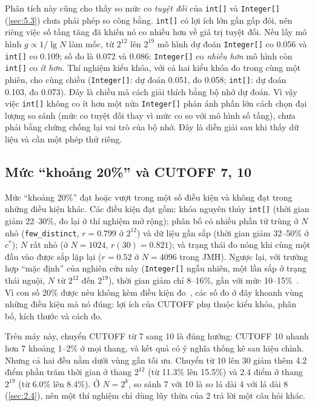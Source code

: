 \documentclass[12pt,a4paper]{article}
\begin{document}
Phân tích này cũng cho thấy so mức co \emph{tuyệt đối} của \texttt{int[]} và \texttt{Integer[]} (\cref{sec:5.3}) chưa phải phép so công bằng. \texttt{int[]} có lợi ích lớn gần gấp đôi, nên riêng việc số tầng tăng đã khiến nó co nhiều hơn về giá trị tuyệt đối. Nếu lấy mô hình $g \propto 1/\lg N$ làm mốc, từ $2^{12}$ lên $2^{19}$ mô hình dự đoán \texttt{Integer[]} co 0.056 và \texttt{int[]} co 0.109; số đo là 0.072 và 0.086: \texttt{Integer[]} co \emph{nhiều hơn} mô hình còn \texttt{int[]} co \emph{ít hơn}. Thí nghiệm kiểu khóa, với cả hai kiểu khóa đo trong cùng một phiên, cho cùng chiều (\texttt{Integer[]}: dự đoán 0.051, đo 0.058; \texttt{int[]}: dự đoán 0.103, đo 0.073). Đây là chiều mà cách giải thích bằng bộ nhớ dự đoán. Vì vậy việc \texttt{int[]} không co ít hơn một nửa \texttt{Integer[]} phản ánh phần lớn cách chọn đại lượng so sánh (mức co tuyệt đối thay vì mức co so với mô hình số tầng), chưa phải bằng chứng chống lại vai trò của bộ nhớ. Đây là diễn giải sau khi thấy dữ liệu và cần một phép thử riêng.

\subsection{Mức ``khoảng 20\%'' và CUTOFF 7, 10}\label{sec:6.3}\label{sec:6.4}
Mức ``khoảng 20\%'' đạt hoặc vượt trong một số điều kiện và không đạt trong những điều kiện khác. Các điều kiện đạt gồm: khóa nguyên thủy \texttt{int[]} (thời gian giảm 22--30\%, đo lại ở thí nghiệm mở rộng); phân bố có nhiều phần tử trùng ở $N$ nhỏ (\texttt{few\_distinct}, $r = 0.799$ ở $2^{12}$) và dữ liệu gần sắp (thời gian giảm 32--50\% ở $c^*$); $N$ rất nhỏ (ở $N = 1024$, $r(30) = 0.821$); và trạng thái đo nóng khi cùng một đầu vào được sắp lặp lại ($r = 0.52$ ở $N = 4096$ trong JMH). Ngược lại, với trường hợp ``mặc định'' của nghiên cứu này (\texttt{Integer[]} ngẫu nhiên, một lần sắp ở trạng thái nguội, $N$ từ $2^{12}$ đến $2^{19}$), thời gian giảm chỉ 8--16\%, gần với mức 10--15\%~\citep{algs4mergesort}. Vì con số 20\% được nêu không kèm điều kiện đo~\citep{baigiang}, các số đo ở đây khoanh vùng những điều kiện mà nó đúng: lợi ích của CUTOFF phụ thuộc kiểu khóa, phân bố, kích thước và cách đo.

Trên máy này, chuyển CUTOFF từ 7 sang 10 là đúng hướng: CUTOFF 10 nhanh hơn 7 khoảng 1--2\% ở mọi thang, và kết quả có ý nghĩa thống kê sau hiệu chỉnh. Nhưng cả hai đều nằm dưới vùng gần tối ưu. Chuyển từ 10 lên 30 giảm thêm 4.2 điểm phần trăm thời gian ở thang $2^{12}$ (từ 11.3\% lên 15.5\%) và 2.4 điểm ở thang $2^{19}$ (từ 6.0\% lên 8.4\%). Ở $N = 2^k$, so sánh 7 với 10 là so lá dài 4 với lá dài 8 (\cref{sec:2.4}), nên một thí nghiệm chỉ dùng lũy thừa của 2 trả lời một câu hỏi khác.
\end{document}
